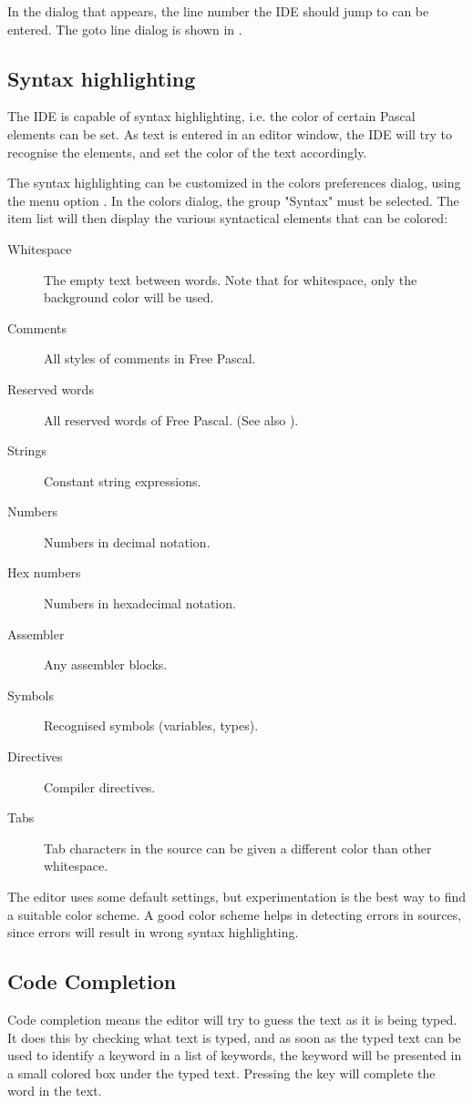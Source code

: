 In the dialog that appears, the line number the IDE should jump to can be
entered. The goto line dialog is shown in .


%
%
\subsection{Syntax highlighting}
\label{se:syntaxhighlighting}
The IDE is capable of syntax highlighting, i.e. the color of certain
Pascal elements can be set. As text is entered in an editor window,
the IDE will try to recognise the elements, and set the color of the
text accordingly.


The syntax highlighting can be customized in the colors preferences dialog,
using the menu option . In the colors dialog, the
group "Syntax" must be selected. The item list will then display the
various syntactical elements that can be colored:
\begin{description}
\item[Whitespace] The empty text between words. Note that for whitespace,
only the background color will be used.
\item[Comments] All styles of comments in Free Pascal.
\item[Reserved words] All reserved words of Free Pascal. (See also ).
\item[Strings] Constant string expressions.
\item[Numbers] Numbers in decimal notation.
\item[Hex numbers] Numbers in hexadecimal notation.
\item[Assembler] Any assembler blocks.
\item[Symbols] Recognised symbols (variables, types).
\item[Directives] Compiler directives.
\item[Tabs] Tab characters in the source can be given a different color than
other whitespace.
\end{description}
The editor uses some default settings, but experimentation is the best way
to find a suitable color scheme. A good color scheme helps in detecting errors
in sources, since errors will result in wrong syntax highlighting.

\subsection{Code Completion}
\label{se:codecompletion}
Code completion means the editor will try to guess the text as it
is being typed. It does this by checking what text is typed, and as soon
as the typed text can be used to identify a keyword in a list of keywords,
the keyword will be presented in a small colored box under the typed text.
Pressing the  key will complete the word in the text.

